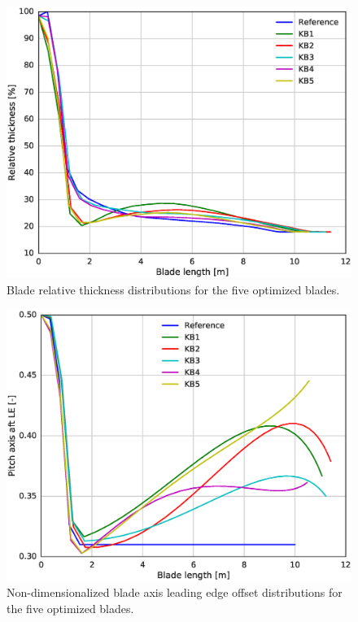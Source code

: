 \begin{figure}[pht]
\begin{center}
	\includegraphics[width=.85\linewidth]{figures/KBcomp_rthick.eps}
\end{center}
\caption{Blade relative thickness distributions for the five optimized blades.}
\label{fig:rthick}
\end{figure}


\begin{figure}[pht]
\begin{center}
	\includegraphics[width=.85\linewidth]{figures/KBcomp_ple.eps}
\end{center}
\caption{Non-dimensionalized blade axis leading edge offset distributions for the five optimized blades.}
\label{fig:p_le}
\end{figure}


